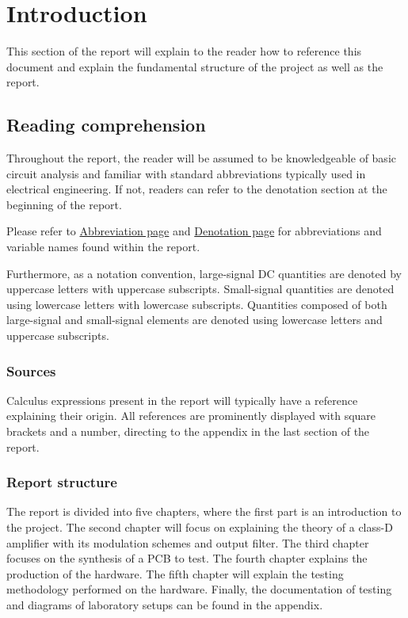 \chapter[Introduction]{Introduction} \label{cha:introduction}
This section of the report will explain to the reader how to reference this document and explain the fundamental structure of the project as well as the report.
\section{Reading comprehension}
Throughout the report, the reader will be assumed to be knowledgeable of basic circuit analysis and familiar with standard abbreviations typically used in electrical engineering. If not, readers can refer to the denotation section at the beginning of the report.

Please refer to \hyperref[cha:abbr]{Abbreviation page} and \hyperref[cha:denotation]{Denotation page} for abbreviations and variable names found within the report.

Furthermore, as a notation convention, large-signal DC quantities are denoted by uppercase letters with uppercase subscripts. Small-signal quantities are denoted using lowercase letters with lowercase subscripts. Quantities composed of both large-signal and small-signal elements are denoted using lowercase letters and uppercase subscripts.

\subsection{Sources}
Calculus expressions present in the report will typically have a reference explaining their origin. All references are prominently displayed with square brackets and a number, directing to the appendix in the last section of the report.

\subsection{Report structure}
The report is divided into five chapters, where the first part is an introduction to the project. The second chapter will focus on explaining the theory of a class-D amplifier with its modulation schemes and output filter. The third chapter focuses on the synthesis of a PCB to test. The fourth chapter explains the production of the hardware. The fifth chapter will explain the testing methodology performed on the hardware. Finally, the documentation of testing and diagrams of laboratory setups can be found in the appendix.

